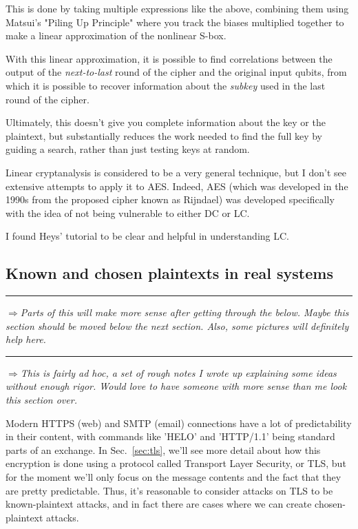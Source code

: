 \documentclass[%
 aip,
 jmp,%
 amsmath,amssymb,
 reprint,%
]{revtex4-1}
\def\outlinecomment#1{\hrule{\color{Blue}$\Rightarrow${\small\em #1}}\hrule}
\def\comment#1{{\color{ForestGreen}$\Rightarrow${\small\em #1}}}
\begin{document}
This is done by taking multiple expressions like the above, combining
them using Matsui's "Piling Up Principle" where you track the biases
multiplied together to make a linear approximation of the nonlinear
S-box.

With this linear approximation, it is possible to find correlations
between the output of the \emph{next-to-last} round of the cipher and the
original input qubits, from which it is possible to recover
information about the \emph{subkey} used in the last round of the cipher.

Ultimately, this doesn't give you complete information about the key
or the plaintext, but substantially reduces the work needed to find
the full key by guiding a search, rather than just testing keys at
random.

Linear cryptanalysis is considered to be a very general technique, but
I don't see extensive attempts to apply it to AES.  Indeed, AES (which
was developed in the 1990s from the proposed cipher known as Rijndael)
was developed specifically with the idea of not being vulnerable to
either DC or LC.

I found Heys' tutorial to be clear and helpful in understanding LC.

\subsection{Known and chosen plaintexts in real systems}

\outlinecomment{Parts of this will make more sense after getting
  through the below.  Maybe this section should be moved below the
  next section.  Also, some pictures will definitely help here.}

\comment{This is fairly ad hoc, a set of rough notes I wrote up
  explaining some ideas without enough rigor.  Would love to have
  someone with more sense than me look this section over.}

Modern HTTPS (web) and SMTP (email) connections have a lot of
predictability in their content, with commands like 'HELO' and
'HTTP/1.1' being standard parts of an exchange.  In
Sec.~\ref{sec:tls}, we'll see more detail about how this encryption is
done using a protocol called Transport Layer Security, or TLS, but for
the moment we'll only focus on the message contents and the fact that
they are pretty predictable.  Thus, it's reasonable to consider
attacks on TLS to be known-plaintext attacks, and in fact there are
cases where we can create chosen-plaintext attacks.
\end{document}
